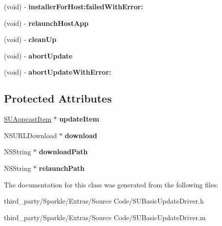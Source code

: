 \begin{DoxyCompactItemize}
(void) -\/ {\bfseries installer\+For\+Host\+:failed\+With\+Error\+:}
\item 
\mbox{\label{interface_s_u_basic_update_driver_a095c8a465ba07f6031fe9c2bd9d2b50d}} 
(void) -\/ {\bfseries relaunch\+Host\+App}
\item 
\mbox{\label{interface_s_u_basic_update_driver_a5daec04d4895bd8dd177818d27200151}} 
(void) -\/ {\bfseries clean\+Up}
\item 
\mbox{\label{interface_s_u_basic_update_driver_abdb1b1f5a07ff61557bee831caf336be}} 
(void) -\/ {\bfseries abort\+Update}
\item 
\mbox{\label{interface_s_u_basic_update_driver_ac37005131f1427836448ea0f52b1cbc9}} 
(void) -\/ {\bfseries abort\+Update\+With\+Error\+:}
\end{DoxyCompactItemize}
\subsection*{Protected Attributes}
\begin{DoxyCompactItemize}
\item 
\mbox{\label{interface_s_u_basic_update_driver_ae2ae0027b37f688aca29bb53850ba851}} 
\mbox{\hyperlink{interface_s_u_appcast_item}{S\+U\+Appcast\+Item}} $\ast$ {\bfseries update\+Item}
\item 
\mbox{\label{interface_s_u_basic_update_driver_aee41f5cd5b3a45cc9d213116078058d7}} 
N\+S\+U\+R\+L\+Download $\ast$ {\bfseries download}
\item 
\mbox{\label{interface_s_u_basic_update_driver_aa144931cbfbb60e868f8d8b67b452702}} 
N\+S\+String $\ast$ {\bfseries download\+Path}
\item 
\mbox{\label{interface_s_u_basic_update_driver_ac66f08198202ba53238c263433e1342d}} 
N\+S\+String $\ast$ {\bfseries relaunch\+Path}
\end{DoxyCompactItemize}


The documentation for this class was generated from the following files\+:\begin{DoxyCompactItemize}
\item 
third\+\_\+party/\+Sparkle/\+Extras/\+Source Code/S\+U\+Basic\+Update\+Driver.\+h\item 
third\+\_\+party/\+Sparkle/\+Extras/\+Source Code/S\+U\+Basic\+Update\+Driver.\+m\end{DoxyCompactItemize}
